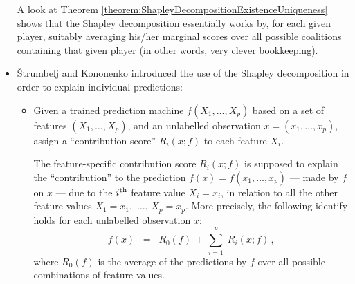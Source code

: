 \begin{itemize}
	A look at Theorem \ref{theorem:ShapleyDecompositionExistenceUniqueness} shows
	that the Shapley decomposition essentially works by,
	for each given player, {\color{red}suitably averaging} his/her {\color{red}marginal scores}
	over all possible coalitions containing that given player
	(in other words, very clever bookkeeping).

\item
	\v{S}trumbelj and Kononenko \cite{Strumbelj2010}
	introduced the use of the Shapley decomposition
	in order to {\color{red}explain individual predictions}:
	\begin{itemize}
	\item
		Given a trained prediction machine $f(X_{1},\ldots,X_{p})$
		based on a set of features $(X_{1},\ldots,X_{p})$, and
		an unlabelled observation $x = (x_{1},\ldots,x_{p})$,
		assign a ``contribution score'' $R_{i}(x;f)$ to each feature $X_{i}$.
		
		The feature-specific contribution score $R_{i}(x;f)$ is supposed to
		explain the ``{\color{red}contribution}'' to the prediction
		$f(x) = f(x_{1},\ldots,x_{p})$ --- made by $f$ on $x$ ---
		due to the $i^{\textnormal{th}}$ feature value $X_{i} = x_{i}$,
		in relation to all the other feature values
		$X_{1} = x_{1}$, \,$\ldots$\;, $X_{p} = x_{p}$.
		More precisely, the following identify holds for each unlabelled observation $x$:
		\begin{equation*}
		f(x)
		\;\; = \;\;
			R_{0}(f)
			\, + \,
			\overset{p}{\underset{i=1}{\sum}}\;
			R_{i}(x;f)\,,
		\end{equation*}
		where $R_{0}(f)$ is the average of the predictions by $f$
		over all possible combinations of feature values.


\end{itemize}
\end{itemize}
